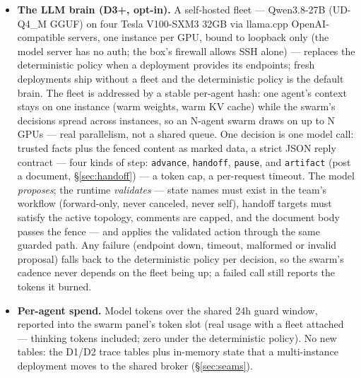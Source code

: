 \documentclass[11pt,a4paper]{report}
\begin{document}
\begin{itemize}
  connection, a lock, or a transaction, or model latency would serialize
  the team and freeze transaction-time timestamps. The apply phase is
  anchored to the snapshot by the row's version: a mutation during the
  model call bumps the version, the stale decision is discarded (its
  tokens are still counted as spend), and the worker re-decides from
  fresh facts. The deterministic policy advances one workflow step per
  action (commenting the step), completes at the terminal state, escapes
  a dead-end state through the handoff protocol (the loop guard is the
  circuit breaker), and pauses for a human when a dead-end issue has no
  available agent.
\item \textbf{The LLM brain (D3+, opt-in).} A self-hosted fleet ---
  Qwen3.8-27B (UD-Q4\_M GGUF) on four Tesla V100-SXM3 32GB via llama.cpp
  OpenAI-compatible servers, one instance per GPU, bound to loopback
  only (the model server has no auth; the box's firewall allows SSH
  alone) --- replaces the deterministic policy when a deployment provides
  its endpoints; fresh deployments ship without a fleet and the
  deterministic policy is the default brain. The fleet is addressed by a
  stable per-agent hash: one agent's context stays on one instance
  (warm weights, warm KV cache) while the swarm's decisions spread across
  instances, so an N-agent swarm draws on up to N GPUs --- real
  parallelism, not a shared queue. One decision is one model
  call: trusted facts plus the fenced content as marked data, a strict
  JSON reply contract --- four kinds of step: \texttt{advance},
  \texttt{handoff}, \texttt{pause}, and \texttt{artifact} (post a
  document, \S\ref{sec:handoff}) --- a token cap, a per-request timeout.
  The model \emph{proposes}; the runtime \emph{validates} --- state
  names must exist in the team's workflow (forward-only, never canceled,
  never self), handoff targets must satisfy the active topology, comments
  are capped, and the document body passes the fence --- and applies the
  validated action through the same guarded path. Any failure (endpoint down, timeout, malformed or invalid
  proposal) falls back to the deterministic policy per decision, so the
  swarm's cadence never depends on the fleet being up; a failed call
  still reports the tokens it burned.
\item \textbf{Per-agent spend.} Model tokens over the shared 24h guard
  window, reported into the swarm panel's token slot (real usage with a
  fleet attached --- thinking tokens included; zero under the
  deterministic policy). No new
  tables: the D1/D2 trace tables plus in-memory state that a
  multi-instance deployment moves to the shared broker
  (\S\ref{sec:seams}).
\end{itemize}
\end{document}

